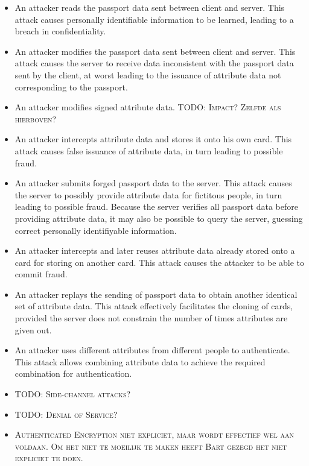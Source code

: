 \begin{itemize}
	\item An attacker reads the passport data sent between client and server. This attack causes personally identifiable information to be learned, leading to a breach in confidentiality. 
  \item An attacker modifies the passport data sent between client and server. This attack causes the server to receive data inconsistent with the passport data sent by the client, at worst leading to the issuance of attribute data not corresponding to the passport.
  \item An attacker modifies signed attribute data. \textsc{TODO: Impact? Zelfde als hierboven?}
  \item An attacker intercepts attribute data and stores it onto his own card. This attack causes false issuance of attribute data, in turn leading to possible fraud.
  \item An attacker submits forged passport data to the server. This attack causes the server to possibly provide attribute data for fictitous people, in turn leading to possible fraud. Because the server verifies all passport data before providing attribute data, it may also be possible to query the server, guessing correct personally identifiyable information.
  \item An attacker intercepts and later reuses attribute data already stored onto a card for storing on another card. This attack causes the attacker to be able to commit fraud.
  \item An attacker replays the sending of passport data to obtain another identical set of attribute data. This attack effectively facilitates the cloning of cards, provided the server does not constrain the number of times attributes are given out.
  \item An attacker uses different attributes from different people to authenticate. This attack allows combining attribute data to achieve the required combination for authentication. 
  \item \textsc{TODO: Side-channel attacks?}
  \item \textsc{TODO: Denial of Service?}
  \item \textsc{Authenticated Encryption niet expliciet, maar wordt effectief wel aan voldaan. Om het niet te moeilijk te maken heeft Bart gezegd het niet expliciet te doen.}
\end{itemize}

